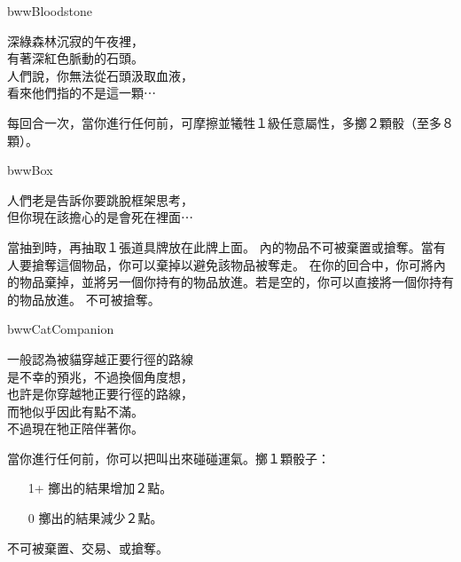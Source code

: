 %
\begin{OmenCard}{bww}{Bloodstone}{}
  \begin{CardStory}
    深綠森林沉寂的午夜裡，\\
    有著深紅色脈動的石頭。\\
    人們說，你無法從石頭汲取血液，\\
    看來他們指的不是這一顆⋯
  \end{CardStory}
  每回合一次，當你進行任何前，可摩擦\ThisName{}並犧牲１級任意屬性，多擲２顆骰（至多８顆）。\smallbreak
\end{OmenCard}%
\linebreak[0]%
\begin{OmenCard}{bww}{Box}{}
  \begin{CardStory}
    人們老是告訴你要跳脫框架思考，\\
    但你現在該擔心的是會死在裡面⋯
  \end{CardStory}
  當抽到\ThisName{}時，再抽取１張道具牌放在此牌上面。\smallbreak
  \ThisName{}內的物品不可被棄置或搶奪。當有人要搶奪這個物品，你可以棄掉\ThisName{}以避免該物品被奪走。\smallbreak
  在你的回合中，你可將\ThisName{}內的物品棄掉，並將另一個你持有的物品放進\ThisName{}。若\ThisName{}是空的，你可以直接將一個你持有的物品放進\ThisName{}。\smallbreak
  \ThisName{}不可被搶奪。\smallbreak
\end{OmenCard}%
\linebreak[0]%
\begin{OmenCard}{bww}{Cat}{Companion}
  \begin{CardStory}
    一般認為被貓穿越正要行徑的路線\\
    是不幸的預兆，不過換個角度想，\\
    也許是你穿越牠正要行徑的路線，\\
    而牠似乎因此有點不滿。\\
    不過現在牠正陪伴著你。
  \end{CardStory}
  當你進行任何前，你可以把\ThisName{}叫出來碰碰運氣。擲１顆骰子：
  \begin{itemize}
    \item[1+] 擲出的結果增加２點。
    \item[0] 擲出的結果減少２點。
  \end{itemize}
  \ThisName{}不可被棄置、交易、或搶奪。\smallbreak
\end{OmenCard}%
\linebreak[0]%
